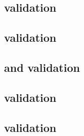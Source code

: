 \begin{sbmlenum}
\end{sbmlenum} \subsection*{ validation} \begin{sbmlenum}


\end{sbmlenum} \subsection*{ validation} \begin{sbmlenum}


\begin{blockChanged}


\end{blockChanged}

\end{sbmlenum} \subsection*{ and  validation} \begin{sbmlenum}


\end{sbmlenum} \subsection*{ validation} \begin{sbmlenum}


\end{sbmlenum} \subsection*{ validation} \begin{sbmlenum}


\end{sbmlenum}
